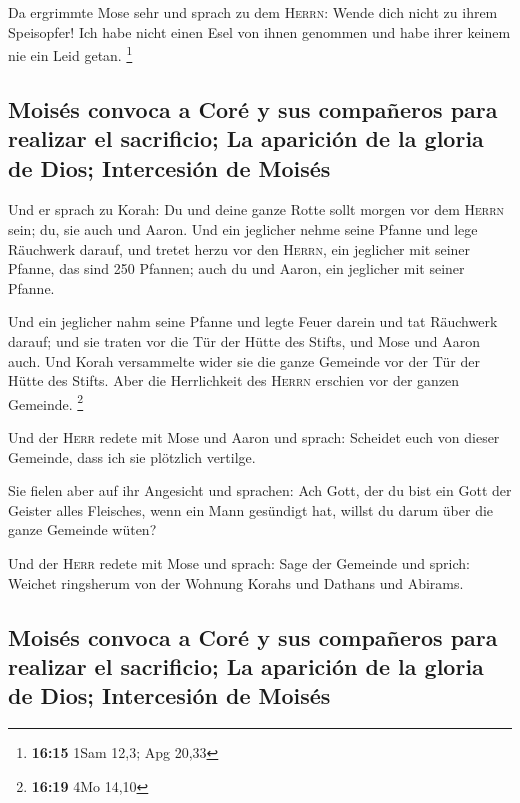  Da ergrimmte Mose sehr und sprach zu dem \textsc{Herrn}:
Wende dich nicht zu ihrem Speisopfer! Ich habe nicht einen Esel von
ihnen genommen und habe ihrer keinem nie ein Leid getan. \footnote{\textbf{16:15}
  1Sam 12,3; Apg 20,33}

\hypertarget{moisuxe9s-convoca-a-coruxe9-y-sus-compauxf1eros-para-realizar-el-sacrificio-la-apariciuxf3n-de-la-gloria-de-dios-intercesiuxf3n-de-moisuxe9s}{%
\subsection{Moisés convoca a Coré y sus compañeros para realizar el
sacrificio; La aparición de la gloria de Dios; Intercesión de
Moisés}\label{moisuxe9s-convoca-a-coruxe9-y-sus-compauxf1eros-para-realizar-el-sacrificio-la-apariciuxf3n-de-la-gloria-de-dios-intercesiuxf3n-de-moisuxe9s}}

 Und er sprach zu Korah: Du und deine ganze Rotte sollt
morgen vor dem \textsc{Herrn} sein; du, sie auch und Aaron.
 Und ein jeglicher nehme seine Pfanne und lege Räuchwerk
darauf, und tretet herzu vor den \textsc{Herrn}, ein jeglicher mit
seiner Pfanne, das sind 250 Pfannen; auch du und Aaron, ein jeglicher
mit seiner Pfanne.

 Und ein jeglicher nahm seine Pfanne und legte Feuer
darein und tat Räuchwerk darauf; und sie traten vor die Tür der Hütte
des Stifts, und Mose und Aaron auch.  Und Korah
versammelte wider sie die ganze Gemeinde vor der Tür der Hütte des
Stifts. Aber die Herrlichkeit des \textsc{Herrn} erschien vor der ganzen
Gemeinde. \footnote{\textbf{16:19} 4Mo 14,10}

 Und der \textsc{Herr} redete mit Mose und Aaron und
sprach:  Scheidet euch von dieser Gemeinde, dass ich sie
plötzlich vertilge.

 Sie fielen aber auf ihr Angesicht und sprachen: Ach
Gott, der du bist ein Gott der Geister alles Fleisches, wenn ein Mann
gesündigt hat, willst du darum über die ganze Gemeinde wüten?

 Und der \textsc{Herr} redete mit Mose und sprach:
 Sage der Gemeinde und sprich: Weichet ringsherum von der
Wohnung Korahs und Dathans und Abirams.

\hypertarget{moisuxe9s-convoca-a-coruxe9-y-sus-compauxf1eros-para-realizar-el-sacrificio-la-apariciuxf3n-de-la-gloria-de-dios-intercesiuxf3n-de-moisuxe9s-1}{%
\subsection{Moisés convoca a Coré y sus compañeros para realizar el
sacrificio; La aparición de la gloria de Dios; Intercesión de
Moisés}\label{moisuxe9s-convoca-a-coruxe9-y-sus-compauxf1eros-para-realizar-el-sacrificio-la-apariciuxf3n-de-la-gloria-de-dios-intercesiuxf3n-de-moisuxe9s-1}}

